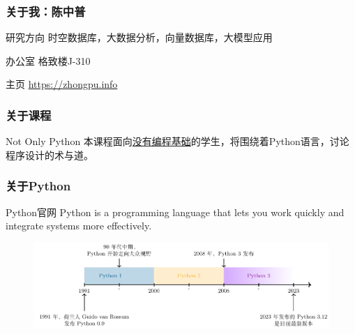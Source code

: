 \documentclass[aspectratio=169, 14pt]{beamer}
\begin{document}
\begin{frame}
	\frametitle{关于我：陈中普}

	\begin{block}{ 研究方向}
		时空数据库，大数据分析，向量数据库，大模型应用
	\end{block}

	\begin{block}{ 办公室}
		格致楼J-310
	\end{block}

	\begin{block}{ 主页}
		\href{https://zhongpu.info}{https://zhongpu.info}
	\end{block}

\end{frame}
\begin{frame}
	\frametitle{关于课程}
	\begin{block}{Not Only Python}
		本课程面向\underline{没有编程基础}的学生，将围绕着Python语言，讨论程序设计的\alert{术}与\alert{道}。
	\end{block}
\end{frame}

\begin{frame}
	\frametitle{关于Python}
	\begin{block}{Python官网}
		Python is a programming language that lets you work quickly and integrate systems more effectively.
	\end{block}

	\begin{figure}
		\center
		\includegraphics[height=.45\paperheight]{week1/Timeline.pdf}
	\end{figure}
\end{frame}
\end{document}
